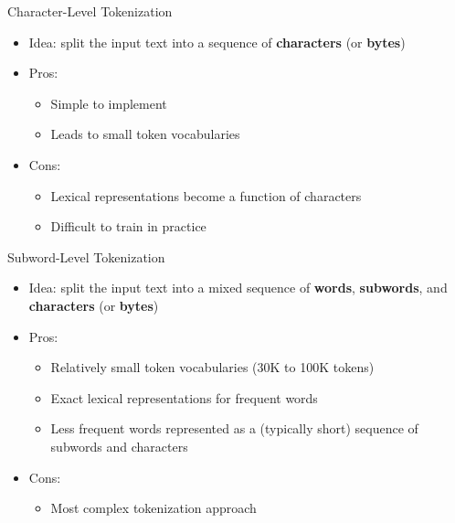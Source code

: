 \documentclass[11pt,compress,t,notes=noshow, xcolor=table]{beamer}
\begin{document}
\begin{frame}{Character-Level Tokenization}

\vfill

\begin{itemize}
\item Idea: split the input text into a sequence of \textbf{characters} (or \textbf{bytes})
\item Pros:
\begin{itemize}
\item Simple to implement
\item Leads to small token vocabularies
\end{itemize}
\item Cons:
\begin{itemize}
\item Lexical representations become a function of characters
\item Difficult to train in practice

\end{itemize}
\end{itemize}

\vfill


\end{frame}



\begin{frame}{Subword-Level Tokenization}

\vfill

\begin{itemize}
\item Idea: split the input text into a mixed sequence of \textbf{words}, \textbf{subwords}, and \textbf{characters} (or \textbf{bytes})
\item Pros:
\begin{itemize}
\item Relatively small token vocabularies (30K to 100K tokens)
\item Exact lexical representations for frequent words
\item Less frequent words represented as a (typically short) sequence of subwords and characters
\end{itemize}
\item Cons:
\begin{itemize}
\item Most complex tokenization approach
\end{itemize}

\end{itemize}

\vfill

\end{frame}
\end{document}
